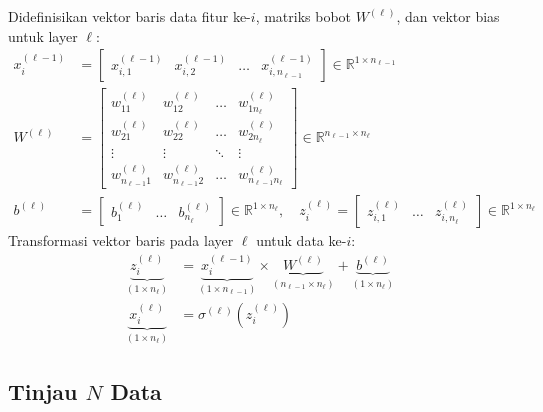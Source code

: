 \documentclass[11pt,a4paper]{article}
\def\mathbf#1{#1}%
\theoremstyle{plain}
\theoremstyle{definition}
\theoremstyle{remark}
\begin{document}
Didefinisikan vektor baris data fitur ke-$i$, matriks bobot $W^{(\ell)}$, dan vektor bias untuk layer $\ell$:
\begin{align}
    \mathbf{x}^{(\ell-1)}_i &= \begin{bmatrix} x^{(\ell-1)}_{i, 1} & x^{(\ell-1)}_{i, 2} & \dots & x^{(\ell-1)}_{i, n_{\ell-1}} \end{bmatrix} \in \mathbb{R}^{1 \times n_{\ell-1}} \label{eq:vector_x_prev} \\
    W^{(\ell)} &= \begin{bmatrix}
        w^{(\ell)}_{11} & w^{(\ell)}_{12} & \dots & w^{(\ell)}_{1 n_\ell} \\
        w^{(\ell)}_{21} & w^{(\ell)}_{22} & \dots & w^{(\ell)}_{2 n_\ell} \\
        \vdots & \vdots & \ddots & \vdots \\
        w^{(\ell)}_{n_{\ell-1} 1} & w^{(\ell)}_{n_{\ell-1} 2} & \dots & w^{(\ell)}_{n_{\ell-1} n_\ell}
    \end{bmatrix} \in \mathbb{R}^{n_{\ell-1} \times n_\ell} \label{eq:matrix_W} \\
    \mathbf{b}^{(\ell)} &= \begin{bmatrix} b^{(\ell)}_1 & \dots & b^{(\ell)}_{n_\ell} \end{bmatrix} \in \mathbb{R}^{1 \times n_\ell}, \quad
    \mathbf{z}^{(\ell)}_i = \begin{bmatrix} z^{(\ell)}_{i, 1} & \dots & z^{(\ell)}_{i, n_\ell} \end{bmatrix} \in \mathbb{R}^{1 \times n_\ell} \label{eq:vectors_bz}
\end{align}
Transformasi vektor baris pada layer $\ell$ untuk data ke-$i$:
\begin{align}
    \underbrace{\mathbf{z}^{(\ell)}_i}_{(1 \times n_\ell)} &= \underbrace{\mathbf{x}^{(\ell-1)}_i}_{(1 \times n_{\ell-1})} \times \underbrace{W^{(\ell)}}_{(n_{\ell-1} \times n_\ell)} + \underbrace{\mathbf{b}^{(\ell)}}_{(1 \times n_\ell)} \label{eq:vector_z} \\
    \underbrace{\mathbf{x}^{(\ell)}_i}_{(1 \times n_\ell)} &= \sigma^{(\ell)}\left( \mathbf{z}^{(\ell)}_i \right) \label{eq:vector_x}
\end{align}

\subsection{Tinjau \texorpdfstring{$N$}{N} Data}
\label{subsec:matriks_batch}
\end{document}
